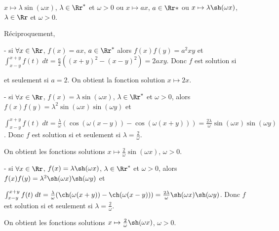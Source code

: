 {{\begin{center}
$x\mapsto\lambda\sin(\omega x)$, $\lambda\in\Rr^*$ et $\omega>0$ ou $x\mapsto ax$, $a\in\Rr*$ ou $x\mapsto \lambda\sh(\omega x)$, $\lambda\in\Rr$ et $\omega>0$.
\end{center}

Réciproquement,

- si $\forall x\in\Rr$, $f(x)=ax$, $a\in\Rr^*$ alors $f(x)f(y)=a^2xy$ et $\int_{x-y}^{x+y}f(t)\;dt= \frac{a}{2}((x+y)^2-(x-y)^2)=2axy$. Donc $f$ est solution si

et seulement si $a=2$. On obtient la fonction solution $x\mapsto2x$.

- si $\forall x\in\Rr$, $f(x)=\lambda\sin(\omega x)$, $\lambda\in\Rr^*$ et $\omega>0$, alors $f(x)f(y)=\lambda^2\sin(\omega x)\sin(\omega y)$ et 

$\int_{x-y}^{x+y}f(t)\;dt= \frac{\lambda}{\omega}(\cos(\omega(x-y))-\cos(\omega(x+y)))= \frac{2\lambda}{\omega}\sin(\omega x)\sin(\omega y)$. Donc $f$ est solution si et seulement si $\lambda= \frac{2}{\omega}$.

On obtient les fonctions solutions $x\mapsto \frac{2}{\omega}\sin(\omega x)$, $\omega>0$.

- si $\forall x\in\Rr$, $f(x)=\lambda\sh(\omega x)$, $\lambda\in\Rr^*$ et $\omega>0$, alors $f(x)f(y)=\lambda^2\sh(\omega x)\sh(\omega y)$ et 

$\int_{x-y}^{x+y}f(t)\;dt= \frac{\lambda}{\omega}(\ch(\omega(x+y))-\ch(\omega(x-y)))= \frac{2\lambda}{\omega}\sh(\omega x)\sh(\omega y)$. Donc $f$ est solution si et seulement si $\lambda= \frac{2}{\omega}$.

On obtient les fonctions solutions $x\mapsto \frac{2}{\omega}\sh(\omega x)$, $\omega>0$.
}
}
